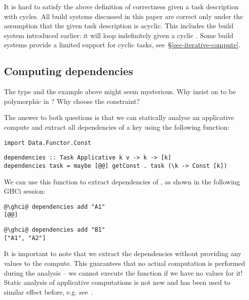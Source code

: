 It is hard to satisfy the above definition of correctness given a task
description with cycles. All build systems discussed in this paper are correct
only under the assumption that the given task description is acyclic. This
includes the  build system introduced earlier: it will loop
indefinitely given a cyclic . Some build systems provide a limited
support for cyclic tasks, see~\S\ref{sec-iterative-compute}.

\subsection{Computing dependencies}\label{sec-deps}

The  type and the example above might seem mysterious. Why insist on
 to be polymorphic in ? Why choose the 
constraint?

The answer to both questions is that we can statically analyse an applicative
compute and extract all dependencies of a key using the following function:

\vspace{1mm}
\begin{verbatim}
import Data.Functor.Const
\end{verbatim}
\vspace{0.5mm}
\begin{verbatim}
dependencies :: Task Applicative k v -> k -> [k]
dependencies task = maybe [@@] getConst . task (\k -> Const [k])
\end{verbatim}
\vspace{1mm}

\noindent
We can use this function to extract dependencies of , as shown in the
following GHCi session:

\vspace{1mm}
\begin{verbatim}
@\ghci@ dependencies add "A1"
[@@]
\end{verbatim}
\begin{verbatim}
@\ghci@ dependencies add "B1"
["A1", "A2"]
\end{verbatim}
\vspace{1mm}

\noindent
It is important to note that we extract the dependencies without providing any
values to the compute. This guarantees that no actual computation is performed
during the analysis -- we cannot execute the function \hs{(+)} if we have no
values for it! Static analysis of applicative computations is not new and has
been used to similar effect before, e.g. see~\cite{free-applicatives}.

